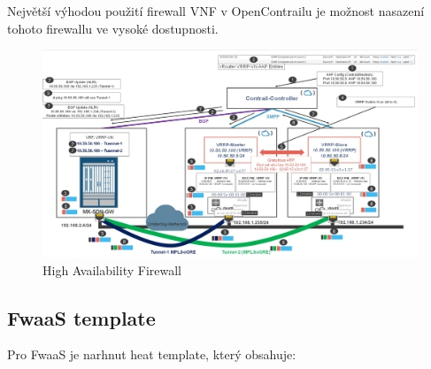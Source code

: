Největší výhodou použití firewall VNF v OpenContrailu je možnost nasazení tohoto firewallu ve vysoké dostupnosti.

\begin{figure}[h]
\begin{centering}
\includegraphics[scale=0.11]{images/contrailHA}
\par\end{centering}
\caption{High Availability Firewall\label{fig:contrailHA}}
\end{figure}


\subsection{FwaaS template}

Pro FwaaS je narhnut heat template, který obsahuje:

